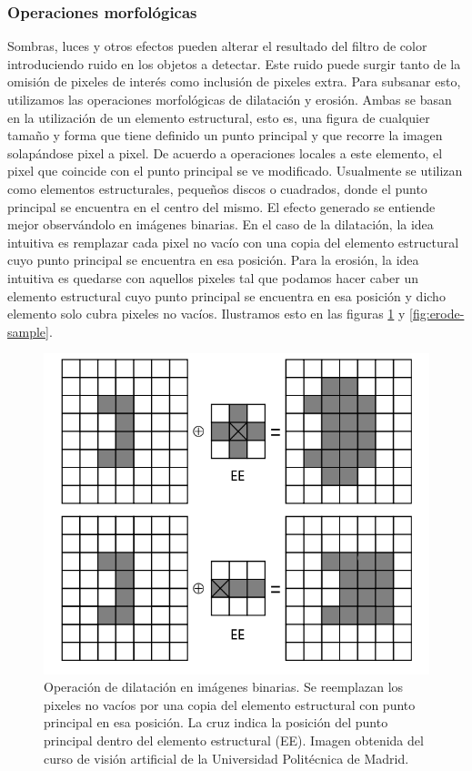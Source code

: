 	\subsubsection{\label{sec:morph} Operaciones morfol\'ogicas}
Sombras, luces y otros efectos pueden alterar el resultado del filtro 
de color introduciendo ruido en los objetos a detectar. Este ruido 
puede surgir tanto de la omisi\'on de pixeles de inter\'es como  inclusi\'on de pixeles extra. Para subsanar esto, utilizamos las operaciones morfol\'ogicas de dilataci\'on y erosi\'on. Ambas se basan en la utilizaci\'on de un elemento estructural, esto es, una figura de cualquier tama\~no y forma que tiene definido un punto principal y que recorre la imagen solap\'andose pixel a pixel. De acuerdo a operaciones locales a este elemento, el pixel que coincide con el punto principal se ve modificado. Usualmente se utilizan como elementos estructurales, peque\~nos discos o cuadrados, donde el punto principal se encuentra en el centro del mismo. El efecto generado se entiende mejor observ\'andolo en im\'agenes binarias. En el caso de la dilataci\'on, la idea intuitiva es remplazar cada pixel no vac\'io con una copia del elemento estructural cuyo punto principal se encuentra en esa posici\'on. Para la erosi\'on, la idea intuitiva es quedarse con aquellos pixeles tal que podamos hacer caber un elemento estructural cuyo punto principal se encuentra en esa posici\'on y dicho elemento solo cubra pixeles no vac\'ios.
Ilustramos esto en las figuras \ref{fig:dilate-sample} y \ref{fig:erode-sample}.


\begin{figure}[tpb]
\begin{center}
  \includegraphics[scale=0.4]{vision/figures/dilate-sample.png}
\end{center}
  \caption[Operaci\'on de dilataci\'on]{\small Operaci\'on de dilataci\'on en im\'agenes binarias. Se reemplazan los pixeles no vac\'ios por una copia del elemento estructural con punto principal en esa posici\'on. La cruz indica la posici\'on del punto principal dentro del elemento estructural (EE). Imagen obtenida del curso de visi\'on artificial de la Universidad Polit\'ecnica de Madrid.}
  \label{fig:dilate-sample}
\end{figure}

